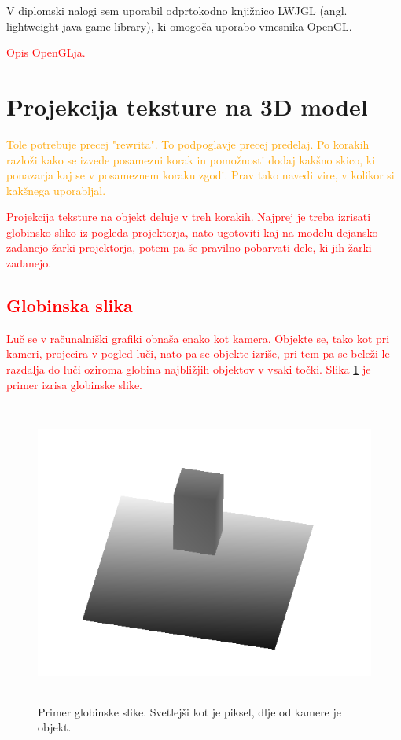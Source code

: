 \documentclass[a4paper, 12pt]{book}
\begin{document}
V diplomski nalogi sem uporabil odprtokodno knjižnico LWJGL (angl. lightweight java game library), ki omogoča uporabo vmesnika OpenGL.

\textcolor{red}{Opis OpenGLja.}

\section{Projekcija teksture na 3D model}

\textcolor{orange}{Tole potrebuje precej "rewrita". To podpoglavje precej predelaj. Po korakih razloži kako se izvede posamezni korak in pomožnosti dodaj kakšno skico, ki ponazarja kaj se v posameznem koraku zgodi. Prav tako navedi vire, v kolikor si kakšnega uporabljal.}

\textcolor{red}{Projekcija teksture na objekt deluje v treh korakih. Najprej je treba izrisati globinsko sliko iz pogleda projektorja, nato ugotoviti kaj na modelu dejansko zadanejo žarki projektorja, potem pa še pravilno pobarvati dele, ki jih žarki zadanejo.}
\textcolor{red}{\subsection*{Globinska slika}}
\textcolor{red}{Luč se v računalniški grafiki obnaša enako kot kamera. Objekte se, tako kot pri kameri, projecira v pogled luči, nato pa se objekte izriše, pri tem pa se beleži le razdalja do luči oziroma globina najbližjih objektov v vsaki točki. Slika \ref{globinskaslika} je primer izrisa globinske slike.}

\begin{figure}[h]
\begin{center}
\includegraphics[width=12cm, height=10cm, keepaspectratio=true]{Globinska_slika.png}
\end{center}
\caption{Primer globinske slike. Svetlejši kot je piksel, dlje od kamere je objekt.}
\label{globinskaslika}
\end{figure}
\end{document}
